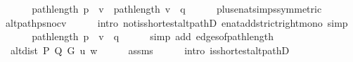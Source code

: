 \begin{isabellebody}
\ \ \isamarkupfalse%
\ \isamarkupfalse%
\ {\isachardoublequoteopen}{\isachardot}{\kern0pt}{\isachardot}{\kern0pt}{\isachardot}{\kern0pt}\ {\isacharless}{\kern0pt}\ path{\isacharunderscore}{\kern0pt}length\ {\isacharparenleft}{\kern0pt}p\ {\isacharat}{\kern0pt}\ {\isacharbrackleft}{\kern0pt}v{\isacharbrackright}{\kern0pt}{\isacharparenright}{\kern0pt}\ {\isacharplus}{\kern0pt}\ path{\isacharunderscore}{\kern0pt}length\ {\isacharparenleft}{\kern0pt}v\ {\isacharhash}{\kern0pt}\ q{\isacharparenright}{\kern0pt}{\isachardoublequoteclose}\isanewline
\ \ \ \ \isamarkupfalse%
\ plus{\isacharunderscore}{\kern0pt}enat{\isacharunderscore}{\kern0pt}simps{\isacharbrackleft}{\kern0pt}symmetric{\isacharbrackright}{\kern0pt}\isanewline
\ \ \ \ \isamarkupfalse%
\ {}\ alt{\isacharunderscore}{\kern0pt}path{\isacharunderscore}{\kern0pt}p{\isacharunderscore}{\kern0pt}snoc{\isacharunderscore}{\kern0pt}v\isanewline
\ \ \ \ \isamarkupfalse%
\ {\isacharparenleft}{\kern0pt}intro\ not{\isacharunderscore}{\kern0pt}is{\isacharunderscore}{\kern0pt}shortest{\isacharunderscore}{\kern0pt}alt{\isacharunderscore}{\kern0pt}pathD\ enat{\isacharunderscore}{\kern0pt}add{\isacharunderscore}{\kern0pt}strict{\isacharunderscore}{\kern0pt}right{\isacharunderscore}{\kern0pt}mono{\isacharparenright}{\kern0pt}\ simp{\isacharplus}{\kern0pt}\isanewline
\ \ \isamarkupfalse%
\ \isamarkupfalse%
\ {\isachardoublequoteopen}{\isachardot}{\kern0pt}{\isachardot}{\kern0pt}{\isachardot}{\kern0pt}\ {\isacharequal}{\kern0pt}\ path{\isacharunderscore}{\kern0pt}length\ {\isacharparenleft}{\kern0pt}p\ {\isacharat}{\kern0pt}\ v\ {\isacharhash}{\kern0pt}\ q{\isacharparenright}{\kern0pt}{\isachardoublequoteclose}\isanewline
\ \ \ \ \isamarkupfalse%
\ {\isacharparenleft}{\kern0pt}simp\ add{\isacharcolon}{\kern0pt}\ edges{\isacharunderscore}{\kern0pt}of{\isacharunderscore}{\kern0pt}path{\isacharunderscore}{\kern0pt}length{\isacharparenright}{\kern0pt}\isanewline
\ \ \isamarkupfalse%
\ \isamarkupfalse%
\ {\isachardoublequoteopen}{\isachardot}{\kern0pt}{\isachardot}{\kern0pt}{\isachardot}{\kern0pt}\ {\isacharequal}{\kern0pt}\ alt{\isacharunderscore}{\kern0pt}dist\ P\ Q\ G\ u\ w{\isachardoublequoteclose}\isanewline
\ \ \ \ \isamarkupfalse%
\ assms{\isacharparenleft}{\kern0pt}{}{\isacharparenright}{\kern0pt}\isanewline
\ \ \ \ \isamarkupfalse%
\ {\isacharparenleft}{\kern0pt}intro\ is{\isacharunderscore}{\kern0pt}shortest{\isacharunderscore}{\kern0pt}alt{\isacharunderscore}{\kern0pt}pathD{\isacharparenleft}{\kern0pt}{}{\isacharparenright}{\kern0pt}{\isacharparenright}{\kern0pt}\isanewline

\end{isabellebody}
